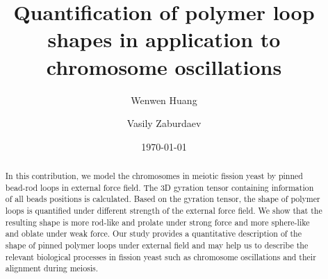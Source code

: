 \documentclass[preprint, aps, superscriptaddress]{revtex4-1}
\begin{document}
\title{Quantification of polymer loop shapes in application to chromosome oscillations}

\author{Wenwen Huang}
\author{Vasily Zaburdaev}

\date{\today}

\begin{abstract}

    In this contribution, we model the chromosomes in meiotic fission yeast by pinned bead-rod loops in external force field. The 3D gyration tensor containing information of all beads positions is calculated. Based on the gyration tensor, the shape of polymer loops is quantified under different strength of the external force field. We show that the resulting shape is more rod-like and prolate under strong force and more sphere-like and oblate under weak force. Our study provides a quantitative description of the shape of pinned polymer loops under external field and may help us to describe the relevant biological processes in fission yeast such as chromosome oscillations and their alignment during meiosis. 

\end{abstract}
\maketitle
\end{document}
